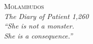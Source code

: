 \cleardoublepage
\thispagestyle{empty}
\vspace*{\fill}
\begin{center}
{\scshape\Large Molambudos}\\[0.4em]
{\small\itshape The Diary of Patient 1,260}\\[6em]

{\large\itshape
``She is not a monster.\\[0.5em]
She is a consequence.''}
\end{center}
\vspace*{\fill}
\clearpage
